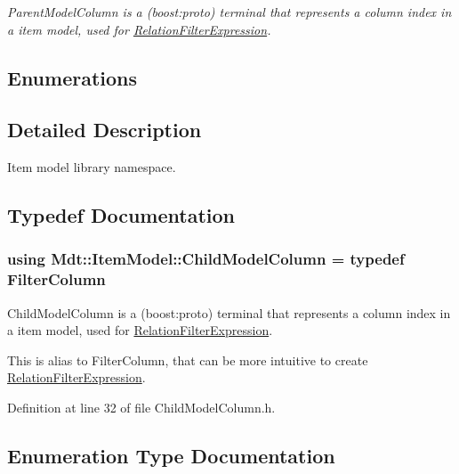 \begin{DoxyCompactItemize}
\begin{DoxyCompactList}\small\item\em Parent\+Model\+Column is a (boost\+:proto) terminal that represents a column index in a item model, used for \hyperlink{class_mdt_1_1_item_model_1_1_relation_filter_expression}{Relation\+Filter\+Expression}. \end{DoxyCompactList}\end{DoxyCompactItemize}
\subsection*{Enumerations}


\subsection{Detailed Description}
Item model library namespace. 

\subsection{Typedef Documentation}
\subsubsection[{\texorpdfstring{Child\+Model\+Column}{ChildModelColumn}}]{\setlength{\rightskip}{0pt plus 5cm}using {\bf Mdt\+::\+Item\+Model\+::\+Child\+Model\+Column} = typedef {\bf Filter\+Column}}\hypertarget{namespace_mdt_1_1_item_model_a60ac754611ae43e31bbe5244b2d24297}{}\label{namespace_mdt_1_1_item_model_a60ac754611ae43e31bbe5244b2d24297}


Child\+Model\+Column is a (boost\+:proto) terminal that represents a column index in a item model, used for \hyperlink{class_mdt_1_1_item_model_1_1_relation_filter_expression}{Relation\+Filter\+Expression}. 

This is alias to Filter\+Column, that can be more intuitive to create \hyperlink{class_mdt_1_1_item_model_1_1_relation_filter_expression}{Relation\+Filter\+Expression}. 

Definition at line 32 of file Child\+Model\+Column.\+h.



\subsection{Enumeration Type Documentation}
